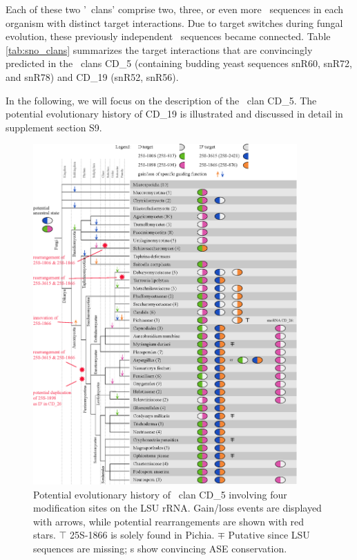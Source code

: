 Each of these two '\sno\ clans' comprise two,
three, or even more \sno\ sequences in each organism with distinct
target interactions. Due to target switches during fungal evolution,
these previously independent \sno\ sequences became connected. Table
\ref{tab:sno_clans} summarizes the target interactions that are
convincingly predicted in the \sno\ clans CD\_5 (containing budding
yeast sequences snR60, snR72, and snR78) and CD\_19 (snR52, snR56).

In the following, we will focus on the description of the \sno\ clan
CD\_5. The potential evolutionary history of CD\_19 is illustrated and
discussed in detail in supplement section S9.

\begin{figure}
  \centering
  \includegraphics[width=0.9\textwidth]{pics/target_switches_CD_5.eps}
  \caption[Potential evolutionary history of \sno\ clan
  CD\_5.]{Potential evolutionary history of \sno\ clan CD\_5 involving
    four modification sites on the LSU rRNA. Gain/loss events are
    displayed with arrows, while potential rearrangements are shown
    with red stars. $\top$ 25S-1866 is solely found in Pichia. $\mp$
    Putative since LSU sequences are missing; \sno s show convincing
    ASE conservation.}
  \label{fig:CD_5}
\end{figure}

